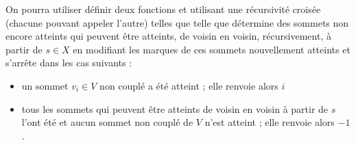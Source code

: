 On pourra utiliser définir deux fonctions  et  utilisant une récursivité croisée (chacune pouvant appeler l'autre) telles que telle que  détermine des sommets non encore atteints qui peuvent être atteints, de voisin en voisin, récursivement, à partir de $s\in X$ en modifiant les marques de ces sommets nouvellement atteints et s’arrête dans les cas suivants :
\begin{itemize}
    \item un sommet $v_i\in V$ non couplé a été atteint ; elle renvoie alors $i$
    \item tous les sommets qui peuvent être atteints de voisin en voisin à partir de $s$ l’ont
été et aucun sommet non couplé de $V$ n’est atteint ; elle renvoie alors $-1$.
\end{itemize}

